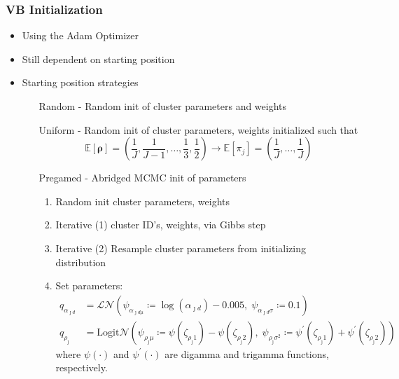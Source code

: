 \documentclass[aspectratio=169,10pt]{beamer}
\begin{document}
\begin{frame}
    \frametitle{VB Initialization}
    {\footnotesize
    \begin{itemize}
        \item Using the Adam Optimizer \cite{kingma2017}
        \item Still dependent on starting position
        \item Starting position strategies
        \begin{enumerate}
            \item[Random] - Random init of cluster parameters and weights
            \item[Uniform] - Random init of cluster parameters, weights initialized such that
            \[
                \mathbb{E}[\bm{\rho}] = \left(\frac{1}{J},\frac{1}{J-1},\ldots,\frac{1}{3},\frac{1}{2}\right)
                \rightarrow \mathbb{E}[\pi_j] = \left(\frac{1}{J},\ldots,\frac{1}{J}\right)
            \]
            \item[Pregamed] - Abridged MCMC init of parameters
            \begin{enumerate}
                \item Random init cluster parameters, weights
                \item Iterative (1) cluster ID's, weights, via Gibbs step
                \item Iterative (2) Resample cluster parameters from initializing distribution
                \item Set parameters:
                \[
                \begin{aligned}
        q_{\alpha_{\jmath d}} &= 
            \mathcal{LN}\left(\psi_{\alpha_{\jmath d \mu}} 
                \coloneqq\log(\alpha_{\jmath d}) - 0.005,\; 
                \psi_{\alpha_{\jmath d}\sigma} \coloneqq0.1\right)\\
        q_{\rho_{\jmath}} &= \text{Logit}\mathcal{N}\left(
        \psi_{\rho_{\jmath}\mu} \coloneqq\psi(\zeta_{\rho_{\jmath} 1}) - \psi(\zeta_{\rho_{\jmath} 2}), \;
            \psi_{\rho_{\jmath}\sigma^2} \coloneqq\psi^{\prime}(\zeta_{\rho_{\jmath} 1}) +
                \psi^{\prime}(\zeta_{\rho_{\jmath} 2})
            \right)
        \end{aligned}   
                \]
                where $\psi(\cdot)$ and $\psi^{\prime}(\cdot)$ are 
                    digamma and trigamma functions, respectively.
            \end{enumerate}
        \end{enumerate}
    \end{itemize}
    }
\end{frame} %
\end{document}
